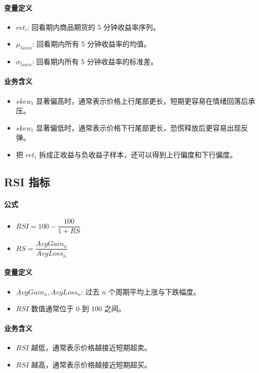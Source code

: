 \documentclass[11pt,a4paper]{ctexart}
\begin{document}
\paragraph{变量定义}
\begin{itemize}
\item $ret_i$: 回看期内商品期货的 5 分钟收益率序列。
\item $\mu_{5min}$: 回看期内所有 5 分钟收益率的均值。
\item $\sigma_{5min}$: 回看期内所有 5 分钟收益率的标准差。
\end{itemize}
\paragraph{业务含义}
\begin{itemize}
\item $skew_t$ 显著偏高时，通常表示价格上行尾部更长，短期更容易在情绪回落后承压。
\item $skew_t$ 显著偏低时，通常表示价格下行尾部更长，恐慌释放后更容易出现反弹。
\item 把 $ret_i$ 拆成正收益与负收益子样本，还可以得到上行偏度和下行偏度。
\end{itemize}
\subsection{RSI 指标}
\paragraph{公式}
\begin{itemize}
\item $RSI=100-\dfrac{100}{1+RS}$
\item $RS=\dfrac{AvgGain_n}{AvgLoss_n}$
\end{itemize}
\paragraph{变量定义}
\begin{itemize}
\item $AvgGain_n, AvgLoss_n$: 过去 $n$ 个周期平均上涨与下跌幅度。
\item $RSI$ 数值通常位于 $0$ 到 $100$ 之间。
\end{itemize}
\paragraph{业务含义}
\begin{itemize}
\item $RSI$ 越低，通常表示价格越接近短期超卖。
\item $RSI$ 越高，通常表示价格越接近短期超买。
\end{itemize}
\end{document}

